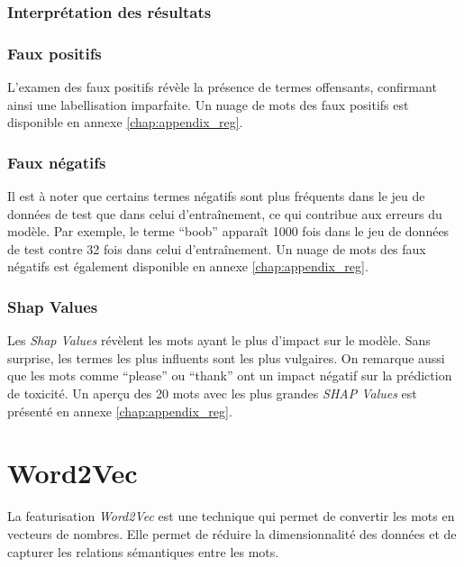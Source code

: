 \subsubsection{Interprétation des résultats}
\subsubsection{Faux positifs}
L'examen des faux positifs révèle la présence de termes offensants, confirmant ainsi une labellisation imparfaite. 
Un nuage de mots des faux positifs est disponible en annexe \ref{chap:appendix_reg}.

\subsubsection{Faux négatifs}
Il est à noter que certains termes négatifs sont plus fréquents dans le jeu de données de test que dans celui d'entraînement, ce qui contribue aux erreurs du modèle.
Par exemple, le terme ``boob'' apparaît 1000 fois dans le jeu de données de test contre 32 fois dans celui d'entraînement. 
Un nuage de mots des faux négatifs est également disponible en annexe \ref{chap:appendix_reg}.

\subsubsection{Shap Values}
Les \textit{Shap Values} révèlent les mots ayant le plus d'impact sur le modèle. 
Sans surprise, les termes les plus influents sont les plus vulgaires. On remarque aussi que les mots comme ``please'' ou ``thank'' ont un impact négatif sur la prédiction de toxicité.
Un aperçu des 20 mots avec les plus grandes \textit{SHAP Values} est présenté en annexe \ref{chap:appendix_reg}.

\section{Word2Vec}
La featurisation \textit{Word2Vec} est une technique qui permet de convertir les mots en vecteurs de nombres. 
Elle permet de réduire la dimensionnalité des données et de capturer les relations sémantiques entre les mots.

